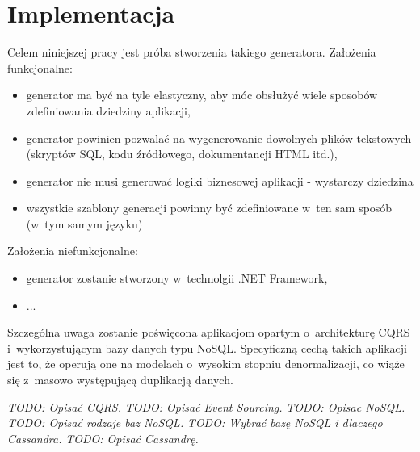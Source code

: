 \chapter{Implementacja} \label{chap:implementation}

Celem niniejszej pracy jest próba stworzenia takiego generatora.
Założenia funkcjonalne:

\begin{itemize}
 \item generator ma być na tyle elastyczny, aby móc obsłużyć wiele sposobów zdefiniowania dziedziny aplikacji,
 \item generator powinien pozwalać na wygenerowanie dowolnych plików tekstowych (skryptów SQL, kodu źródłowego, dokumentancji HTML itd.),
 \item generator nie musi generować logiki biznesowej aplikacji - wystarczy dziedzina
 \item wszystkie szablony generacji powinny być zdefiniowane w~ten sam sposób (w~tym samym języku)
\end{itemize}

Założenia niefunkcjonalne:

\begin{itemize}
 \item generator zostanie stworzony w~technolgii .NET Framework,
 \item ...
\end{itemize}

Szczególna uwaga zostanie poświęcona aplikacjom opartym o~architekturę CQRS i~wykorzystującym bazy danych typu NoSQL.
Specyficzną cechą takich aplikacji jest to, że operują one na modelach o~wysokim stopniu denormalizacji, co wiąże się z~masowo występującą duplikacją danych.

\emph{TODO: Opisać CQRS.}
\emph{TODO: Opisać Event Sourcing.}
\emph{TODO: Opisac NoSQL.}
\emph{TODO: Opisać rodzaje baz NoSQL.}
\emph{TODO: Wybrać bazę NoSQL i dlaczego Cassandra.}
\emph{TODO: Opisać Cassandrę.}
